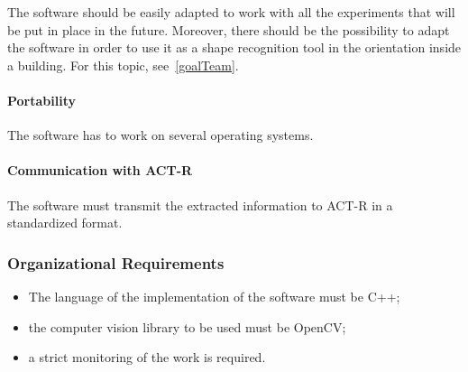 				The software should be easily adapted to work with all the experiments that will be put in place in the future. Moreover, there should be the possibility to adapt the software in order to use it as a shape recognition tool in the orientation inside a building. For this topic, see~\ref{goalTeam}. 				
			
				\paragraph{Portability} 
				The software has to work on several operating systems.
			
				\paragraph{Communication with ACT-R} 			
				The software must transmit the extracted information to \mbox{ACT-R} in a standardized format.

			
			\subsubsection{Organizational Requirements}
			\begin{itemize}
				\item The language of the implementation of the software must be C++;
				\item the computer vision library to be used must be OpenCV;
			    	\item a strict monitoring of the work is required.					
			\end{itemize}
		

